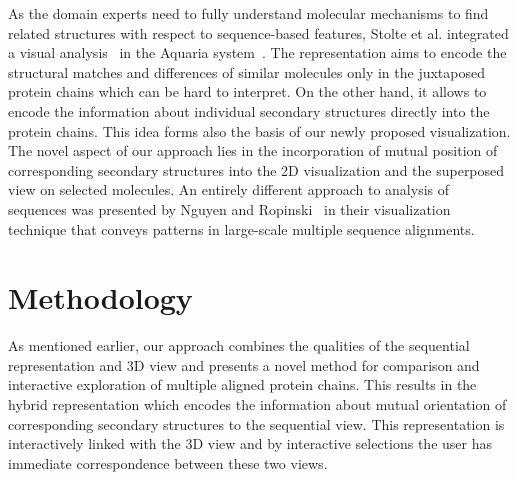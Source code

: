 \documentclass[twocolumn]{bmcart}%
\begin{document}
As the domain experts need to fully understand molecular mechanisms to find related structures with respect to sequence-based features, Stolte et al. integrated a visual analysis~\cite{Stolte2015} in the Aquaria system~\cite{odonoghue2015}.
The representation aims to encode the structural matches and differences of similar molecules only in the juxtaposed protein chains which can be hard to interpret.
On the other hand, it allows to encode the information about individual secondary structures directly into the protein chains.
This idea forms also the basis of our newly proposed visualization.
The novel aspect of our approach lies in the incorporation of mutual position of corresponding secondary structures into the 2D visualization and the superposed view on selected molecules.
An entirely different approach to analysis of sequences was presented by Nguyen and Ropinski~\cite{Nguyen2013} in their visualization technique that conveys patterns in large-scale multiple sequence alignments.


\section*{Methodology}
As mentioned earlier, our approach combines the qualities of the sequential representation and 3D view and presents a novel method for comparison and interactive exploration of multiple aligned protein chains.
This results in the hybrid representation which encodes the information about mutual orientation of corresponding secondary structures to the sequential view.
This representation is interactively linked with the 3D view and by interactive selections the user has immediate correspondence between these two views.
\end{document}
